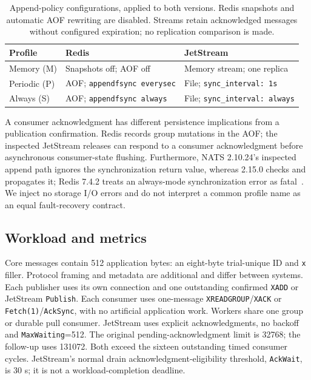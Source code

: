\documentclass[11pt]{article}
\theoremstyle{definition}
\newcommand{\code}[1]{\texttt{#1}}
\begin{document}
\begin{table}[htbp]
\centering\small
\begin{tabular}{L{.13\linewidth}L{.36\linewidth}L{.39\linewidth}}
\toprule
Profile & Redis & JetStream\\
\midrule
Memory (M) & Snapshots off; AOF off & Memory stream; one replica\\
Periodic (P) & AOF; \code{appendfsync everysec} & File; \code{sync\_interval: 1s}\\
Always (S) & AOF; \code{appendfsync always} & File; \code{sync\_interval: always}\\
\bottomrule
\end{tabular}
\caption{Append-policy configurations, applied to both versions. Redis snapshots and automatic AOF rewriting are disabled. Streams retain acknowledged messages without configured expiration; no replication comparison is made.}
\label{tab:configs}
\end{table}

A consumer acknowledgment has different persistence implications from a publication confirmation. Redis records group mutations in the AOF; the inspected JetStream releases can respond to a consumer acknowledgment before asynchronous consumer-state flushing. Furthermore, NATS 2.10.24's inspected append path ignores the synchronization return value, whereas 2.15.0 checks and propagates it; Redis 7.4.2 treats an always-mode synchronization error as fatal~\cite{redis742aof,nats21024filestore,nats2150filestore}. We inject no storage I/O errors and do not interpret a common profile name as an equal fault-recovery contract.

\subsection{Workload and metrics}

Core messages contain 512 application bytes: an eight-byte trial-unique ID and \code{x} filler. Protocol framing and metadata are additional and differ between systems. Each publisher uses its own connection and one outstanding confirmed \code{XADD} or JetStream \code{Publish}. Each consumer uses one-message \code{XREADGROUP}/\code{XACK} or \code{Fetch(1)}/\code{AckSync}, with no artificial application work. Workers share one group or durable pull consumer. JetStream uses explicit acknowledgments, no backoff and \code{MaxWaiting}=512. The original pending-acknowledgment limit is 32768; the follow-up uses 131072. Both exceed the sixteen outstanding timed consumer cycles. JetStream's normal drain acknowledgment-eligibility threshold, \code{AckWait}, is 30 s; it is not a workload-completion deadline.
\end{document}
